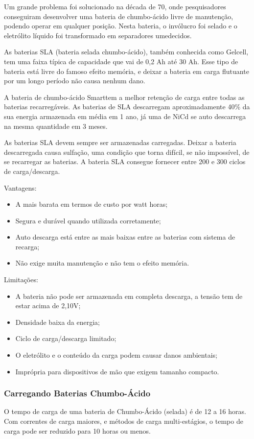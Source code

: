 Um grande problema foi solucionado na década de 70, onde pesquisadores conseguiram desenvolver uma bateria de chumbo-ácido livre de manutenção, podendo operar em qualquer posição. Nesta bateria, o invólucro foi selado e o eletrólito líquido foi transformado em separadores umedecidos.

As baterias SLA (bateria selada chumbo-ácido), também conhecida como Gelcell, tem uma faixa típica de capacidade que vai de 0,2 Ah até 30 Ah. Esse tipo de bateria está livre do famoso efeito memória, e deixar a bateria em carga flutuante por um longo período não causa nenhum dano.

A bateria de chumbo-ácido Smarttem a melhor retenção de carga entre todas as baterias recarregáveis. As baterias de SLA descarregam aproximadamente 40\% da sua energia armazenada em média em 1 ano, já uma de NiCd se auto descarrega na mesma quantidade em 3 meses.

As baterias SLA devem sempre ser armazenadas carregadas. Deixar a bateria descarregada causa sulfação, uma condição que torna difícil, se não impossível, de se recarregar as baterias. A bateria SLA consegue fornecer entre 200 e 300 ciclos de carga/descarga.

Vantagens:
\begin{itemize}
 \item A mais barata em termos de custo por watt horas;
 \item Segura e durável quando utilizada corretamente;
 \item Auto descarga está entre as mais baixas entre as baterias com sistema de recarga;
 \item Não exige muita manutenção e não tem o efeito memória.
\end{itemize}

Limitações:
\begin{itemize}
 \item A bateria não pode ser armazenada em completa descarga, a tensão tem de estar acima de 2,10V;
 \item Densidade baixa da energia;
 \item Ciclo de carga/descarga limitado;
 \item O eletrólito e o conteúdo da carga podem causar danos ambientais;
 \item Imprópria para dispositivos de mão que exigem tamanho compacto.
\end{itemize}

\subsubsection{Carregando Baterias Chumbo-Ácido}
O tempo de carga de uma bateria de Chumbo-Ácido (selada) é de 12 a 16 horas. Com correntes de carga maiores, e métodos de carga multi-estágios, o tempo de carga pode ser reduzido para 10 horas ou menos.

